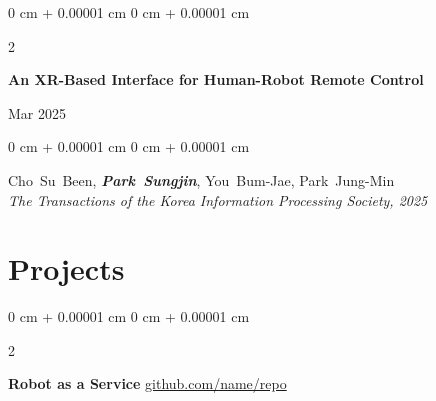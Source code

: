 \documentclass[10pt, letterpaper]{article}
\newenvironment{onecolentry}{
    \begin{adjustwidth}{
        0 cm + 0.00001 cm
    }{
        0 cm + 0.00001 cm
    }
}{
    \end{adjustwidth}
} %
\newenvironment{twocolentry}[2][]{
    \onecolentry
    \def\secondColumn{#2}
    \setcolumnwidth{\fill, 4.5 cm}
    \begin{paracol}{2}
}{
    \switchcolumn \raggedleft \secondColumn
    \end{paracol}
    \endonecolentry
} %
\begin{document}

            

                

            \begin{twocolentry}{
                Mar 2025
            }
                \textbf{An XR-Based Interface for Human-Robot Remote Control}
            \end{twocolentry}

            \vspace{0.10 cm}
            
            \begin{onecolentry}
                \mbox{Cho Su Been}, \mbox{\textbf{\textit{Park Sungjin}}}, \mbox{You Bum-Jae}, \mbox{Park Jung-Min}
                \vspace{0.10 cm} \\
                \textit{The Transactions of the Korea Information Processing Society, 2025}
            \end{onecolentry}
            \vspace{0.2 cm}
    

    \section{Projects}
        \begin{twocolentry}{
            \href{https://github.com/sinaatalay/rendercv}{github.com/name/repo}
        }
            \textbf{Robot as a Service}\end{twocolentry}
\end{document}
